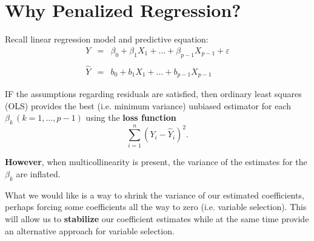 \documentclass[12pt]{notes}
\begin{document}

\section{Why Penalized Regression?}

Recall linear regression model and predictive equation:
 \begin{eqnarray}
   Y & = & \beta_0 + \beta_1 X_1 + \ldots + \beta_{p-1}X_{p-1} + \varepsilon \nonumber \\
   & & \nonumber \\
   \hat{Y} & = & b_0 + b_1 X_1 + \ldots + b_{p-1}X_{p-1} \nonumber
 \end{eqnarray}
 
 \nspace
 
 IF the assumptions regarding residuals are satisfied, then ordinary least squares (OLS) provides the best (i.e. minimum variance) unbiased estimator for each $\beta_k \,(k = 1, \ldots, p-1)$ using the \textbf{loss function}
 $$\sum_{i=1}^n\left(Y_i - \hat{Y}_i\right)^2.$$
 
\nspace
\textbf{However}, when multicollinearity is present, the variance of the estimates for the $\beta_k$ are inflated.

\nspace 
{}

 \begin{minipage}[l][4cm][c]{\textwidth}

\end{minipage}

What we would like is a way to shrink the variance of our estimated coefficients, perhaps forcing some coefficients all the way to zero (i.e. variable selection). This will allow us to \textbf{stabilize} our coefficient estimates while at the same time provide an alternative approach for variable selection. 
\end{document}
